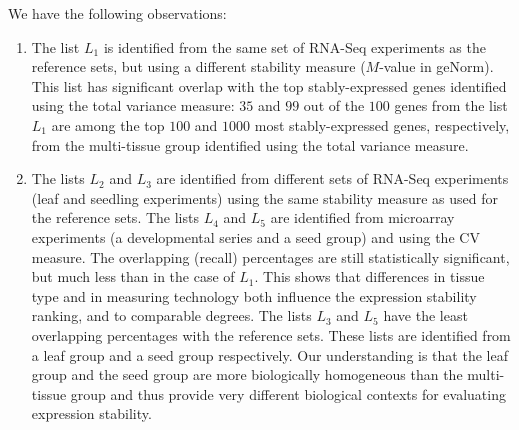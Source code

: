 \documentclass[letterpaper,12pt]{article}
\begin{document}
We have the following observations:
\begin{enumerate}
    \item
	The list $L_1$ is identified from the same set of RNA-Seq experiments as the
	reference sets, but using a different stability measure ($M$-value in
	geNorm). This list has significant overlap with the top
	stably-expressed genes identified using the total variance measure:
	$35$ and $99$ out of the $100$ genes from the list $L_1$ are among the
	top $100$ and $1000$ most stably-expressed genes, respectively, from the
	multi-tissue group identified using the total variance measure. 
    \item
	The lists $L_2$ and $L_3$ are identified from different sets of
	RNA-Seq experiments (leaf and seedling experiments) using the same
	stability measure as used for the reference sets. The lists $L_4$ and $L_5$ are
	identified from microarray experiments (a developmental series and a
	seed group) and using the CV measure. The overlapping (recall)
	percentages are still statistically significant, but much less than in
	the case of $L_1$.  This shows that differences in tissue type and in
	measuring technology both influence the expression stability ranking,
	and to comparable degrees. The lists $L_3$ and $L_5$ have the least
	overlapping percentages with the reference sets. These lists are
	identified from a leaf group and a seed group respectively.
	Our understanding is that the leaf group and the seed group are more
	biologically homogeneous than the multi-tissue group and thus provide
	very different biological contexts for evaluating expression stability.
\end{enumerate}


\end{document}
